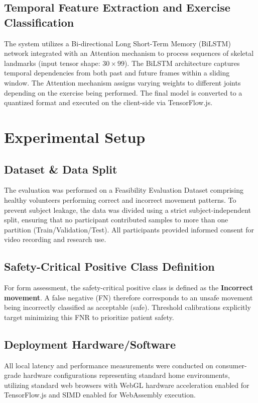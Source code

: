 \documentclass[conference]{IEEEtran}
\begin{document}
\subsection{Temporal Feature Extraction and Exercise Classification}
The system utilizes a Bi-directional Long Short-Term Memory (BiLSTM) network integrated with an Attention mechanism to process sequences of skeletal landmarks (input tensor shape: $30 \times 99$). The BiLSTM architecture captures temporal dependencies from both past and future frames within a sliding window. The Attention mechanism assigns varying weights to different joints depending on the exercise being performed. The final model is converted to a quantized format and executed on the client-side via TensorFlow.js.

\section{Experimental Setup}

\subsection{Dataset \& Data Split}
The evaluation was performed on a Feasibility Evaluation Dataset comprising healthy volunteers performing correct and incorrect movement patterns. To prevent subject leakage, the data was divided using a strict subject-independent split, ensuring that no participant contributed samples to more than one partition (Train/Validation/Test). All participants provided informed consent for video recording and research use.

\subsection{Safety-Critical Positive Class Definition}
For form assessment, the safety-critical positive class is defined as the \textbf{Incorrect movement}. A false negative (FN) therefore corresponds to an unsafe movement being incorrectly classified as acceptable (safe). Threshold calibrations explicitly target minimizing this FNR to prioritize patient safety.

\subsection{Deployment Hardware/Software}
All local latency and performance measurements were conducted on consumer-grade hardware configurations representing standard home environments, utilizing standard web browsers with WebGL hardware acceleration enabled for TensorFlow.js and SIMD enabled for WebAssembly execution.
\end{document}
